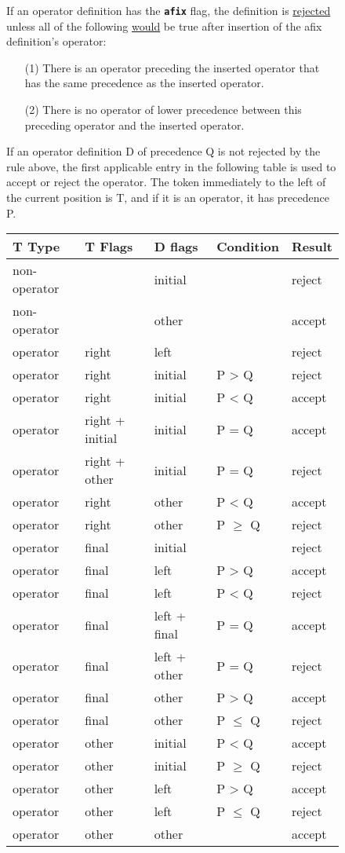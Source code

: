 \documentclass[12pt]{article}
\makeatletter
\newcommand{\TT}[1]{{\tt \bfseries #1}}
\newcommand{\ttkey}[1]{\TT{#1}\index{#1@\TT{#1}}}
\newlength{\figurewidth}
\newenvironment{boxedfigure}[1][!btp]%
	{\begin{figure*}[#1]
	 \begin{lrbox}{\figurebox}
	 \begin{minipage}{\figurewidth}

	 \vspace*{1ex}}%
	{
	 \vspace*{1ex}

	 \end{minipage}
	 \end{lrbox}

	 \centering
	 \fbox{\hspace*{0.1in}\usebox{\figurebox}\hspace*{0.1in}}
	 \end{figure*}}
\makeatother
\begin{document}
\begin{boxedfigure}[!t]

If an operator definition has the \ttkey{afix} flag,
the definition
is \underline{rejected} unless all of the following \underline{would} be true
after insertion of the afix definition's operator:
\begin{itemize}
\item[(1)] There is an operator preceding the inserted operator
that has the same precedence as the inserted operator.
\item[(2)] There is no
operator of lower precedence between this preceding operator
and the inserted operator.
\end{itemize}

If an operator definition D of precedence Q is not rejected
by the rule above,
the first applicable entry in the following table is used
to accept or reject the operator.
The token immediately to the left of the current position
is T, and if it is an operator, it has precedence P.

\begin{center}
\begin{tabular}{lllll}
T Type		& T Flags
			& D flags	& Condition	& Result
\\\hline
non-operator	&	& initial	&	& reject \\
non-operator	&	& other	 	&	& accept
\\[0.5ex]
operator	& right & left		&	& reject \\
operator	& right & initial	& P > Q	& reject \\
operator	& right & initial	& P < Q	& accept \\
operator	& right + initial
			& initial	& P = Q	& accept \\
operator	& right + other
			& initial	& P = Q & reject \\
operator	& right & other		& P < Q	& accept \\
operator	& right & other		& P $\ge$ Q	& reject
\\[0.5ex]
operator	& final & initial	&	& reject \\
operator	& final & left		& P > Q	& accept \\
operator	& final & left		& P < Q	& reject \\
operator	& final & left + final 	& P = Q	& accept \\
operator	& final & left + other	& P = Q	& reject \\
operator	& final & other		& P > Q	& accept \\
operator	& final & other		& P $\le$ Q	& reject
\\[0.5ex]
operator	& other	 & initial	& P < Q	& accept \\
operator	& other	 & initial	& P $\ge$ Q	& reject \\
operator	& other	 & left		& P > Q	& accept \\
operator	& other	 & left		& P $\le$ Q	& reject \\
operator	& other	 & other	& 	& accept \\


\end{tabular}
\end{center}
\end{boxedfigure}
\end{document}
